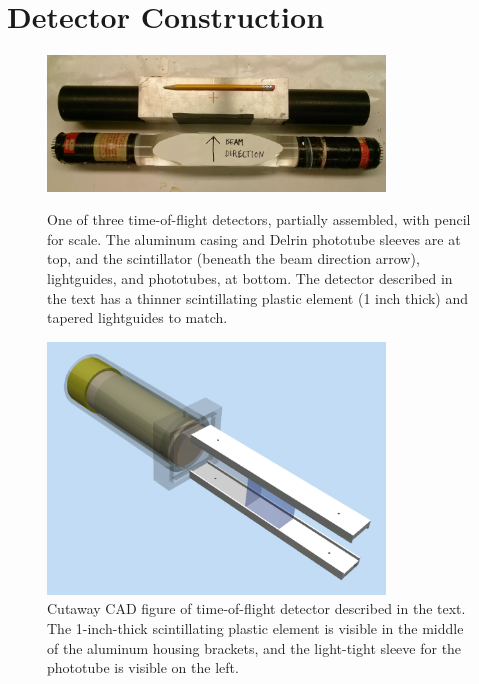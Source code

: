 \section{Detector Construction}
\begin{figure}
    \centering
    \includegraphics[width=0.8\textwidth]{figures/Scintillator_disassembled.jpg}
    \caption[Time-of-flight detector partially assembled]
    {One of three time-of-flight detectors, partially assembled, with pencil for scale.
    The aluminum casing and Delrin phototube sleeves are at top, and the
scintillator (beneath the beam direction arrow), lightguides, and phototubes, at
bottom. The detector described in the text has a thinner scintillating plastic
element (1 inch thick) and tapered lightguides to match.}
    \label{TOFDetectorDisassembled}

    \vspace*{\floatsep}

    \centering
    \includegraphics[width=0.8\textwidth]{figures/TimeOfFlightCAD.png}
    \caption[Cutaway CAD figure of time-of-flight detector.]
{
    Cutaway CAD figure of time-of-flight detector described in the text. The 
    1-inch-thick scintillating plastic element is visible in the middle of the aluminum 
    housing brackets, and the light-tight sleeve for the phototube is visible on
    the left.
}
    \label{TOFCAD}
\end{figure}

